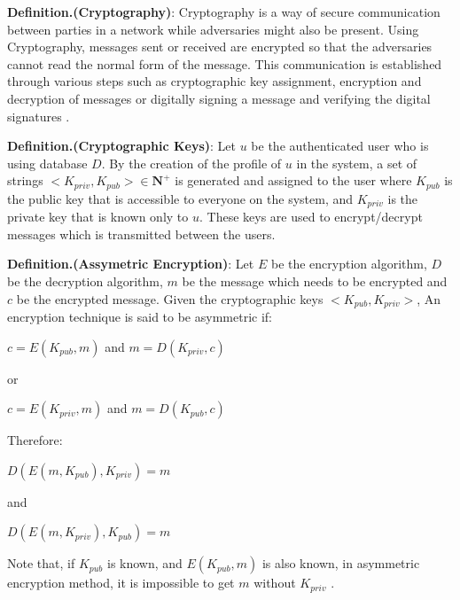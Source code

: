 \textbf{Definition.(Cryptography)}:
Cryptography is a way of secure communication between parties in a network while adversaries might also be present. Using Cryptography, messages sent or received are encrypted so that the adversaries cannot read the normal form of the message. This communication is established through various steps such as cryptographic key assignment, encryption and decryption of messages or digitally signing a message and verifying the digital signatures \cite{stallings2017cryptography}.

\textbf{Definition.(Cryptographic Keys)}: Let $u$ be the authenticated user who is using database $D$. By the creation of the profile of $u$ in the system, a set of strings $<K_{priv},K_{pub}> \in \mathbf{N}^+$ is generated and assigned to the user where $K_{pub}$ is the public key that is accessible to everyone on the system, and $K_{priv}$ is the private key that is known only to $u$. These keys are used to encrypt/decrypt messages which is transmitted between the users\cite{stallings2017cryptography}.

\textbf{Definition.(Assymetric Encryption)}: Let $E$ be the encryption algorithm, $D$ be the decryption algorithm, $m$ be the message which needs to be encrypted and $c$ be the encrypted message. Given the cryptographic keys $<K_{pub}, K_{priv}>$, An encryption technique is said to be asymmetric if:

\begin{center}
	$c = E(K_{pub},m)$ and  $m = D(K_{priv},c)$
\end{center}
or
\begin{center}
	$c = E(K_{priv},m)$ and  $m = D(K_{pub},c)$
\end{center}
Therefore:
\begin{center}
	$D(E(m,K_{pub}),K_{priv}) = m$ 
\end{center}
and
\begin{center}
	$D(E(m,K_{priv}),K_{pub}) = m$
\end{center}
Note that, if $K_{pub}$ is known, and $E(K_{pub},m)$ is also known, in asymmetric encryption method, it is impossible to get $m$ without $K_{priv}$ \cite{stallings2017cryptography}.


